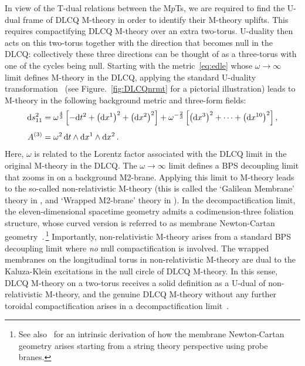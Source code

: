 \documentclass[11pt]{article}
\renewcommand{\emph}[1]{\textit{#1}}
\newcommand{\dd}{\mathrm{d}}
\begin{document}
In view of the T-dual relations between the M$p$Ts, we are required to find the U-dual frame of DLCQ M-theory in order to identify their M-theory uplifts. This requires compactifying DLCQ M-theory over an extra two-torus.
U-duality then acts on this two-torus together with the direction that becomes null in the DLCQ: collectively these three directions can be thought of as a three-torus with one of the cycles being null. Starting with the metric~\eqref{eq:edle} whose $\omega \rightarrow \infty$ limit defines M-theory in the DLCQ, applying the standard U-duality transformation~\cite{Obers:1998fb} (see Figure.~\ref{fig:DLCQnrmt} for a pictorial illustration) leads to M-theory in the following background metric and three-form fields:
%
\begin{subequations} \label{eq:nrmtdef}
\begin{align}
	\dd s^2_{11} & = \omega^{\frac{4}{3}} \, \Bigl[ - \dd t^2 + \bigl( \dd x^1 \bigr)^2 + \bigl( \dd x^2 \bigr)^2 \Bigr] + \omega^{- \frac{2}{3}} \, \Bigl[ \bigl( \dd x^3 \bigr)^2 + \cdots + \bigl( \dd x^{10} \bigr)^2 \Bigr]\,, \\[4pt]
	A^{(3)} & = \omega^2 \, \dd t \wedge \dd x^1 \wedge \dd x^2\,.  
\end{align}
\end{subequations}
%
Here, $\omega$ is related to the Lorentz factor associated with the DLCQ limit in the original M-theory in the DLCQ. The $\omega \rightarrow \infty$ limit defines a BPS decoupling limit that zooms in on a background M2-brane. Applying this limit to M-theory leads to the so-called non-relativistic M-theory (this is called the `Galilean Membrane' theory in \cite{Gomis:2000bd}, and `Wrapped M2-brane' theory in  \cite{Danielsson:2000gi, Garcia:2002fa}). In the decompactification limit, the eleven-dimensional spacetime geometry admits a codimension-three foliation structure, whose curved version is referred to as membrane Newton-Cartan geometry~\cite{Blair:2021waq}.\,\footnote{See also~\cite{Ebert:2021mfu} for an intrinsic derivation of how the membrane Newton-Cartan geometry arises starting from a string theory perspective using probe branes.} Importantly, non-relativistic M-theory arises from a standard BPS decoupling limit where \emph{no} null compactification is involved. The wrapped membranes on the longitudinal torus in non-relativistic M-theory are dual to the Kaluza-Klein excitations in the null circle of DLCQ M-theory. In this sense, DLCQ M-theory on a two-torus receives a solid definition as a U-dual of non-relativistic M-theory, and the genuine DLCQ M-theory without any further toroidal compactification arises in a decompactification limit~\cite{Ebert:2023hba, Blair:2023noj}. 
\end{document}
